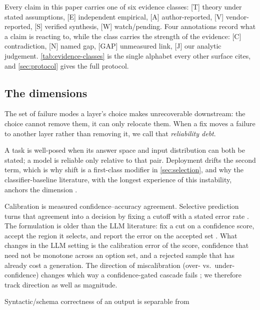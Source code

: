 Every claim in this paper carries one of six evidence classes: [T] theory under stated assumptions,
[E] independent empirical, [A] author-reported, [V] vendor-reported, [S] verified synthesis,
[W] watch/pending. Four annotations record what a claim is reacting to, while the class carries
the strength of the evidence: [C] contradiction, [N]
named gap, [GAP] unmeasured link, [J] our analytic judgement.
\cref{tab:evidence-classes} is the single alphabet every other surface cites, and
\cref{sec:protocol} gives the full protocol.

\subsection{The dimensions}
\begin{description}[leftmargin=1.5em, itemsep=1pt]
\item[Inherited failure envelope.] The set of failure modes a layer's choice makes unrecoverable
downstream: the choice cannot remove them, it can only relocate them. When a fix moves a failure
to another layer rather than removing it, we call that \emph{reliability debt}.
\item[Well-posedness under distribution shift.] A task is well-posed when its answer space and
input distribution can both be stated; a model is reliable only relative to that pair.
Deployment drifts the second term, which is why shift is a first-class modifier in
\cref{sec:selection}, and why the classifier-baseline literature, with
the longest experience of this instability, anchors the dimension
\cite{id231108298,id250315850}.
\item[Calibration and selective prediction.] Calibration is measured confidence--accuracy
agreement. Selective prediction turns that agreement into a decision by fixing a cutoff with a
stated error rate \cite{id240718418,id260704430}. The formulation is older than the LLM
literature: fix a cut on a confidence score, accept the region it selects, and report the error on
the accepted set \cite{geifman2017selective,geifman2019selectivenet}. What changes in the LLM
setting is the calibration error of the score, confidence that need not be monotone across an
option set, and a rejected sample that has already cost a generation. The direction of
miscalibration (over- vs.\ under-confidence) changes which way a confidence-gated cascade fails
\cite{id260933843}; we therefore track direction as well as magnitude.
\item[Validity versus truth.] Syntactic/schema correctness of an output is separable from

\end{description}
